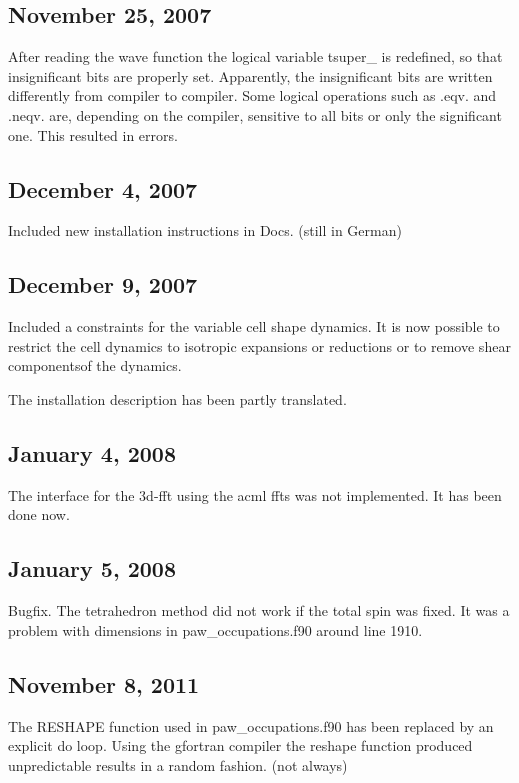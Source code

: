 \documentclass[final,12pt]{article}
\begin{document}
\subsection{November 25,  2007}

After reading the wave function the logical variable tsuper\_ is
redefined, so that insignificant bits are properly set. Apparently,
the insignificant bits are written differently from compiler to
compiler. Some logical operations such as .eqv. and .neqv. are,
depending on the compiler, sensitive to all bits or only the
significant one. This resulted in errors.

\subsection{December 4,  2007}

Included new installation instructions in Docs. (still in German)

\subsection{December 9,  2007}

Included a constraints for the variable cell shape dynamics. It is now
possible to restrict the cell dynamics to isotropic expansions or
reductions or to remove shear componentsof the dynamics.

The installation description has been partly translated.

\subsection{January 4,  2008}

 The interface for the 3d-fft using the acml ffts was not
 implemented. It has been done now.

\subsection{January 5,  2008}

Bugfix. The tetrahedron method did not work if the total spin was
fixed. It was a problem with dimensions in paw\_occupations.f90 around
line 1910.

\subsection{November 8,  2011}

The RESHAPE function used in paw\_occupations.f90 has been replaced by
an explicit do loop. Using the gfortran compiler the reshape function
produced unpredictable results in a random fashion. (not always)


\newpage


\end{document}
